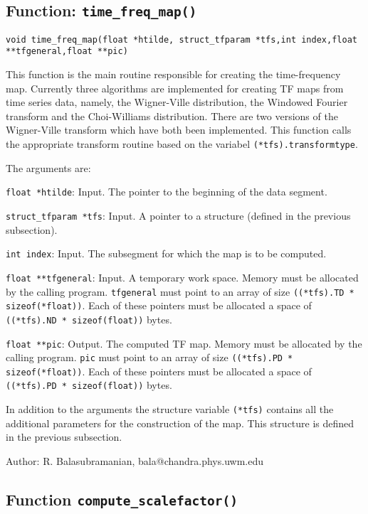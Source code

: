 \newpage

\subsection{Function: {\tt time\_freq\_map()}}

{\tt void time\_freq\_map(float *htilde, struct\_tfparam *tfs,int
index,float **tfgeneral,float **pic)}

This function is the main routine responsible for creating the
time-frequency map. Currently three algorithms are implemented for
creating TF maps from time series data, namely, the Wigner-Ville
distribution, the Windowed Fourier transform and the Choi-Williams
distribution. There are two versions of the  Wigner-Ville transform
which have both been implemented.  
This function calls the appropriate transform routine
based on the variabel {\tt (*tfs).transformtype}. 

The arguments are:

\begin{description}
\item {\tt float *htilde}: Input. The pointer to the beginning of the data
segment.
\item {\tt struct\_tfparam *tfs}: Input. A pointer to a structure
(defined in the previous subsection).
\item {\tt int index}: Input. The subsegment for which the map is
to be computed.
\item{\tt float **tfgeneral}: Input. A temporary work
space. Memory must be allocated by the calling program. {\tt tfgeneral} must
point to an array of size {\tt ((*tfs).TD * sizeof(*float))}. Each of these pointers must
be allocated a space of {\tt ((*tfs).ND * sizeof(float))}  bytes.
\item{\tt  float **pic}: Output. The computed TF map. Memory must
be allocated by the calling program. {\tt pic} must
point to an array of size {\tt ((*tfs).PD * sizeof(*float))}. Each of these pointers must
be allocated a space of {\tt ((*tfs).PD * sizeof(float))} bytes.
\end{description}

In addition to the arguments the structure variable {\tt (*tfs)} contains
all the additional parameters for the construction of the map. This
structure is defined in the previous subsection.

\noindent Author: R. Balasubramanian, bala@chandra.phys.uwm.edu

\subsection{Function {\tt compute\_scalefactor()}}

